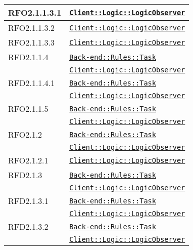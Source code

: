 \begin{longtable}{|>{\centering}m{3cm}|m{10cm}<{\centering}|}
RFO2.1.1.3.1 & \hyperref[Client::Logic::LogicObserver]{\texttt{Client::Logic::LogicObserver}}\\ \hline

RFO2.1.1.3.2 & \hyperref[Client::Logic::LogicObserver]{\texttt{Client::Logic::LogicObserver}}\\ \hline

RFO2.1.1.3.3 & \hyperref[Client::Logic::LogicObserver]{\texttt{Client::Logic::LogicObserver}}\\ \hline

RFD2.1.1.4 & \hyperref[Back-end::Rules::Task]{\texttt{Back-end::Rules::Task}}\\
& \hyperref[Client::Logic::LogicObserver]{\texttt{Client::Logic::LogicObserver}}\\ \hline

RFD2.1.1.4.1 & \hyperref[Back-end::Rules::Task]{\texttt{Back-end::Rules::Task}}\\
& \hyperref[Client::Logic::LogicObserver]{\texttt{Client::Logic::LogicObserver}}\\ \hline

RFO2.1.1.5 & \hyperref[Back-end::Rules::Task]{\texttt{Back-end::Rules::Task}}\\
& \hyperref[Client::Logic::LogicObserver]{\texttt{Client::Logic::LogicObserver}}\\ \hline

RFO2.1.2 & \hyperref[Back-end::Rules::Task]{\texttt{Back-end::Rules::Task}}\\
& \hyperref[Client::Logic::LogicObserver]{\texttt{Client::Logic::LogicObserver}}\\ \hline

RFO2.1.2.1 & \hyperref[Client::Logic::LogicObserver]{\texttt{Client::Logic::LogicObserver}}\\ \hline

RFD2.1.3 & \hyperref[Back-end::Rules::Task]{\texttt{Back-end::Rules::Task}}\\
& \hyperref[Client::Logic::LogicObserver]{\texttt{Client::Logic::LogicObserver}}\\ \hline

RFD2.1.3.1 & \hyperref[Back-end::Rules::Task]{\texttt{Back-end::Rules::Task}}\\
& \hyperref[Client::Logic::LogicObserver]{\texttt{Client::Logic::LogicObserver}}\\ \hline

RFD2.1.3.2 & \hyperref[Back-end::Rules::Task]{\texttt{Back-end::Rules::Task}}\\
& \hyperref[Client::Logic::LogicObserver]{\texttt{Client::Logic::LogicObserver}}\\ \hline


\end{longtable}
